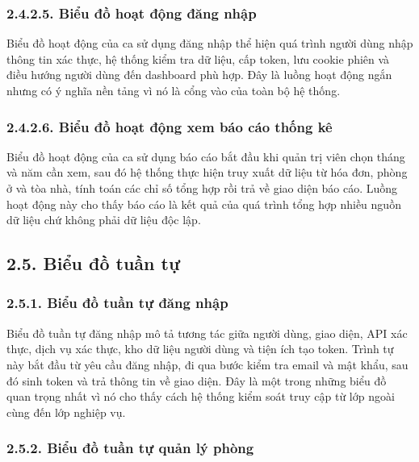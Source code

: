 \documentclass[12pt]{article}
\begin{document}
\subsubsection*{2.4.2.5. Biểu đồ hoạt động đăng nhập}

Biểu đồ hoạt động của ca sử dụng đăng nhập thể hiện quá trình người dùng nhập thông tin xác thực, hệ thống kiểm tra dữ liệu, cấp token, lưu cookie phiên và điều hướng người dùng đến dashboard phù hợp. Đây là luồng hoạt động ngắn nhưng có ý nghĩa nền tảng vì nó là cổng vào của toàn bộ hệ thống.

\subsubsection*{2.4.2.6. Biểu đồ hoạt động xem báo cáo thống kê}

Biểu đồ hoạt động của ca sử dụng báo cáo bắt đầu khi quản trị viên chọn tháng và năm cần xem, sau đó hệ thống thực hiện truy xuất dữ liệu từ hóa đơn, phòng ở và tòa nhà, tính toán các chỉ số tổng hợp rồi trả về giao diện báo cáo. Luồng hoạt động này cho thấy báo cáo là kết quả của quá trình tổng hợp nhiều nguồn dữ liệu chứ không phải dữ liệu độc lập.

\subsection*{2.5. Biểu đồ tuần tự}

\subsubsection*{2.5.1. Biểu đồ tuần tự đăng nhập}

Biểu đồ tuần tự đăng nhập mô tả tương tác giữa người dùng, giao diện, API xác thực, dịch vụ xác thực, kho dữ liệu người dùng và tiện ích tạo token. Trình tự này bắt đầu từ yêu cầu đăng nhập, đi qua bước kiểm tra email và mật khẩu, sau đó sinh token và trả thông tin về giao diện. Đây là một trong những biểu đồ quan trọng nhất vì nó cho thấy cách hệ thống kiểm soát truy cập từ lớp ngoài cùng đến lớp nghiệp vụ.

\subsubsection*{2.5.2. Biểu đồ tuần tự quản lý phòng}
\end{document}
